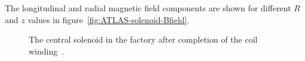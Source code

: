 The longitudinal and radial magnetic field components are shown for different $R$ and $z$ values in figure~\ref{fig:ATLAS-solenoid-Bfield}.

\begin{figure}[htbp]
	\centering
	\caption{The central solenoid in the factory after completion of the coil winding~\cite{atlas-photos}.}
	\label{fig:solenoid}
\end{figure}

